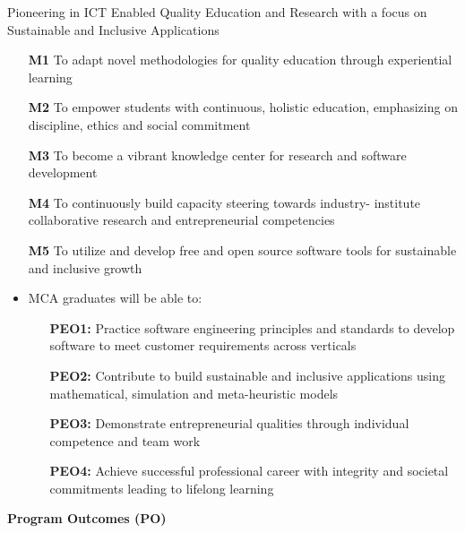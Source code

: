 \documentclass[12pt,a4paper]{article}
\begin{document}

Pioneering in ICT Enabled Quality Education and Research with a focus on Sustainable and Inclusive Applications

\begin{enumerate}[leftmargin=*,labelindent=9.7mm,labelsep=4mm]
\item[\textbf{M1}] To adapt novel methodologies for quality education through experiential learning
\item[\textbf{M2}] To empower students with continuous, holistic education, emphasizing on discipline, ethics and social commitment
\item[\textbf{M3}] To become a vibrant knowledge center for research and software development
\item[\textbf{M4}] To continuously build capacity steering towards industry- institute collaborative research and entrepreneurial competencies
\item[\textbf{M5}] To utilize and develop free and open source software tools for sustainable and inclusive growth
\end{enumerate}
\begin{itemize}
\item MCA graduates will be able to:
\begin{enumerate}[leftmargin=*,labelindent=05.7mm,labelsep=4mm]
\item[\textbf{PEO1:}]Practice software engineering principles and standards to develop software to  meet customer requirements across verticals \vspace{-0.3cm}
\item[\textbf{PEO2:}]Contribute to build sustainable and inclusive applications using mathematical, simulation and meta-heuristic models \vspace{-0.3cm}
\item[\textbf{PEO3:}]Demonstrate entrepreneurial qualities through individual competence and team 
work \vspace{-0.3cm}
\newpage
\item[\textbf{PEO4:}]Achieve successful professional career with integrity and societal commitments  leading to lifelong learning
\end{enumerate}
\end{itemize}
\thispagestyle{plain}
\textbf{\large{Program Outcomes (PO)}}
\end{document}
